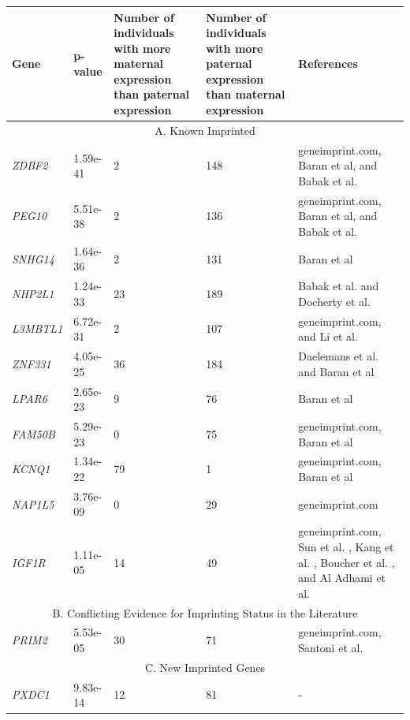 \begin{table}
\centering
\begin{adjustbox}{width={\textwidth}}
\begin{tabular}{@{}p{3cm}|p{2cm}p{5cm}p{5cm}p{6cm}@{}}
\toprule Gene & p-value & Number of individuals with more maternal expression than paternal expression & Number of individuals with more paternal expression than maternal expression & References \\ \midrule
 \multicolumn{5}{c}{A. Known Imprinted}  \\ \midrule
 \emph{ZDBF2} & 1.59e-41 & 2 & 148 & geneimprint.com, Baran et al\citep{Baran:2015cx}, and Babak et al.\citep{Babak2015} \\
 \emph{PEG10} & 5.51e-38 & 2 & 136 & geneimprint.com, Baran et al\citep{Baran:2015cx}, and Babak et al.\citep{Babak2015} \\
 \emph{SNHG14} & 1.64e-36 & 2 & 131 & Baran et al\citep{Baran:2015cx} \\
 \emph{NHP2L1} & 1.24e-33 & 23 & 189 & Babak et al.\citep{Babak2015}  and Docherty et al. \citep{Docherty:2014cx} \\
 \emph{L3MBTL1} & 6.72e-31 & 2 & 107 & geneimprint.com, and Li et al. \citep{Li:2004km}\\
 \emph{ZNF331} & 4.05e-25 & 36 & 184 & Daelemans et al.\citep{Daelemans:2010kc} and Baran et al\citep{Baran:2015cx} \\
 \emph{LPAR6} & 2.65e-23 & 9 & 76 & Baran et al\citep{Baran:2015cx}\\
 \emph{FAM50B} & 5.29e-23 & 0 & 75 & geneimprint.com, Baran et al\citep{Baran:2015cx}\\
 \emph{KCNQ1} & 1.34e-22 & 79 & 1 & geneimprint.com, Baran et al\citep{Baran:2015cx} \\
 \emph{NAP1L5} & 3.76e-09 & 0 & 29 & geneimprint.com \\
 \emph{IGF1R} & 1.11e-05 & 14 & 49 & geneimprint.com, Sun et al. \citep{Sun:2014eq}, Kang et al. \citep{Kang:2015ko}, Boucher et al. \citep{Boucher:2014gk}, and Al Adhami et al.\citep{AlAdhami:2015dx}\\ \midrule
 \multicolumn{5}{c}{B. Conflicting Evidence for Imprinting Status in the Literature}  \\ \midrule
\emph{PRIM2} & 5.53e-05 & 30 & 71 & geneimprint.com, Santoni et al. \citep{Santoni:2017hu}\\ \midrule
\multicolumn{5}{c}{C. New Imprinted Genes}  \\ \midrule
 \emph{PXDC1} & 9.83e-14 & 12 & 81 & - \\

\end{tabular}
\end{adjustbox}
\end{table}

